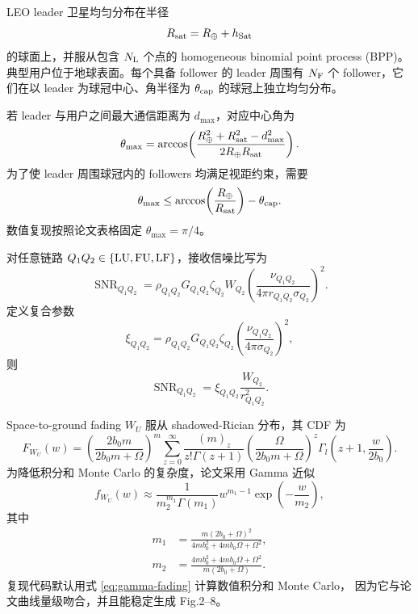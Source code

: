 \documentclass[UTF8,a4paper,11pt]{ctexart}
\newcommand{\Rearth}{R_{\oplus}}
\newcommand{\Rsat}{R_{\rm sat}}
\newcommand{\thetac}{\theta_{\rm cap}}
\newcommand{\thetam}{\theta_{\max}}
\newcommand{\NL}{N_{\rm L}}
\newcommand{\NF}{N_{\rm F}}
\newcommand{\SNR}{\operatorname{SNR}}
\begin{document}
LEO leader 卫星均匀分布在半径
\begin{equation}
    \Rsat=\Rearth+h_{\rm Sat}
\end{equation}
的球面上，并服从包含 $\NL$ 个点的 homogeneous binomial point process
(BPP)。典型用户位于地球表面。每个具备 follower 的 leader 周围有 $\NF$
个 follower，它们在以 leader 为球冠中心、角半径为 $\thetac$ 的球冠上独立均匀分布。

若 leader 与用户之间最大通信距离为 $d_{\max}$，对应中心角为
\begin{equation}
    \thetam=\arccos\!\left(
    \frac{\Rearth^2+\Rsat^2-d_{\max}^2}{2\Rearth\Rsat}
    \right).
    \label{eq:theta-max}
\end{equation}
为了使 leader 周围球冠内的 followers 均满足视距约束，需要
\begin{equation}
    \thetam\leq \arccos\!\left(\frac{\Rearth}{\Rsat}\right)-\thetac .
\end{equation}
数值复现按照论文表格固定 $\thetam=\pi/4$。

对任意链路 $Q_1Q_2\in\{\rm LU,FU,LF\}$，接收信噪比写为
\begin{equation}
    \SNR_{Q_1Q_2}
    =\rho_{Q_1Q_2}G_{Q_1Q_2}\zeta_{Q_2}W_{Q_2}
    \left(\frac{\nu_{Q_1Q_2}}{4\pi r_{Q_1Q_2}\sigma_{Q_2}}\right)^2 .
\end{equation}
定义复合参数
\begin{equation}
    \xi_{Q_1Q_2}=
    \rho_{Q_1Q_2}G_{Q_1Q_2}\zeta_{Q_2}
    \left(\frac{\nu_{Q_1Q_2}}{4\pi\sigma_{Q_2}}\right)^2 ,
\end{equation}
则
\begin{equation}
    \SNR_{Q_1Q_2}=\xi_{Q_1Q_2}\frac{W_{Q_2}}{r_{Q_1Q_2}^2}.
    \label{eq:snr-xi}
\end{equation}

Space-to-ground fading $W_U$ 服从 shadowed-Rician 分布，其 CDF 为
\begin{equation}
F_{W_U}(w)=
\left(\frac{2b_0m}{2b_0m+\Omega}\right)^m
\sum_{z=0}^{\infty}
\frac{(m)_z}{z!\Gamma(z+1)}
\left(\frac{\Omega}{2b_0m+\Omega}\right)^z
\Gamma_l\!\left(z+1,\frac{w}{2b_0}\right).
\end{equation}
为降低积分和 Monte Carlo 的复杂度，论文采用 Gamma 近似
\begin{equation}
    f_{W_U}(w)\approx
    \frac{1}{m_2^{m_1}\Gamma(m_1)}w^{m_1-1}\exp\!\left(-\frac{w}{m_2}\right),
    \label{eq:gamma-fading}
\end{equation}
其中
\begin{align}
    m_1&=\frac{m(2b_0+\Omega)^2}
    {4mb_0^2+4mb_0\Omega+\Omega^2},\\
    m_2&=\frac{4mb_0^2+4mb_0\Omega+\Omega^2}
    {m(2b_0+\Omega)} .
\end{align}
复现代码默认用式 \eqref{eq:gamma-fading} 计算数值积分和 Monte Carlo，
因为它与论文曲线量级吻合，并且能稳定生成 Fig.2--8。
\end{document}
